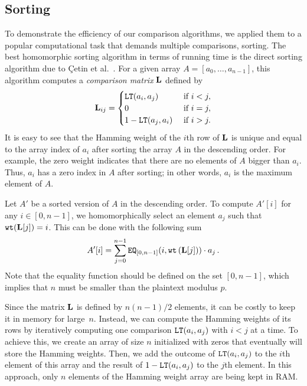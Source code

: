 \subsection{Sorting}
\label{subsec:sorting}

    To demonstrate the efficiency of our comparison algorithms, we applied them to a popular computational task that demands multiple comparisons, sorting.
	The best homomorphic sorting algorithm in terms of running time is the direct sorting algorithm due to {\c C}etin et al.~\cite{CDSS15}.
	For a given array $A = [a_0,\dots,a_{n-1}]$, this algorithm computes a \emph{comparison matrix} $\mathbf{L}$ defined by
	\begin{align*}
		\mathbf{L}_{ij} =
		\begin{cases}
			\mathtt{LT}(a_i, a_j) & \text{ if } i < j, \\
			0 & \text{ if } i = j, \\
			1 - \mathtt{LT}(a_j, a_i) & \text{ if } i > j.
		\end{cases}
	\end{align*}
	It is easy to see that the Hamming weight of the $i$th row of $\mathbf{L}$ is unique and equal to the array index of $a_i$ after sorting the array $A$ in the descending order.
	For example, the zero weight indicates that there are no elements of $A$ bigger than $a_i$. 
	Thus, $a_i$ has a zero index in $A$ after sorting; in other words, $a_i$ is the maximum element of $A$.

	Let $A'$ be a sorted version of $A$ in the descending order.
	To compute $A'[i]$ for any $i \in [0,n-1]$, we homomorphically select an element $a_j$ such that $\texttt{wt}(\mathbf{L}[j]) = i$.
	This can be done with the following sum  
	\begin{align*}
		A'[i] = \sum_{j=0}^{n-1} \mathtt{EQ}_{[0,n-1]}(i,\texttt{wt}\left(\mathbf{L}[j]\right)) \cdot a_j\,.
	\end{align*}
	Note that the equality function should be defined on the set $[0,n-1]$, which implies that $n$ must be smaller than the plaintext modulus $p$.

	\begin{remark}
		Since the matrix $\mathbf{L}$ is defined by $n(n-1)/2$ elements, it can be costly to keep it in memory for large~$n$.
		Instead, we can compute the Hamming weights of its rows by iteratively computing one comparison $\mathtt{LT}(a_i, a_j)$ with $i < j$ at a time.
		To achieve this, we create an array of size $n$ initialized with zeros that eventually will store the Hamming weights.
		Then, we add the outcome of $\mathtt{LT}(a_i, a_j)$ to the $i$th element of this array and the result of $1-\mathtt{LT}(a_i, a_j)$ to the $j$th element.
		In this approach, only $n$ elements of the Hamming weight array are being kept in RAM.
	\end{remark}

